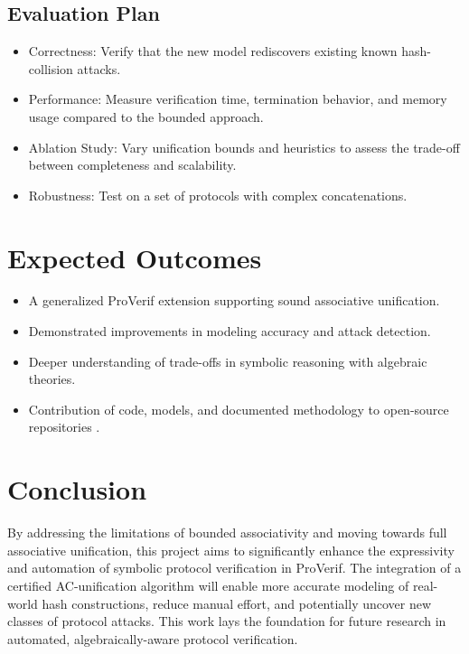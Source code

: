 \documentclass[journal]{IEEEtran}
\begin{document}
\subsection{Evaluation Plan}
\begin{itemize}
    \item Correctness: Verify that the new model rediscovers existing known hash-collision attacks.
    \item Performance: Measure verification time, termination behavior, and memory usage compared to the bounded approach.
    \item Ablation Study: Vary unification bounds and heuristics to assess the trade-off between completeness and scalability.
    \item Robustness: Test on a set of protocols with complex concatenations.
\end{itemize}

\section{Expected Outcomes}
\begin{itemize}
    \item A generalized ProVerif extension supporting sound associative unification.
    \item Demonstrated improvements in modeling accuracy and attack detection.
    \item Deeper understanding of trade-offs in symbolic reasoning with algebraic theories.
    \item Contribution of code, models, and documented methodology to open-source repositories \cite{our_repo, our_docker}.
\end{itemize}

\section{Conclusion}
By addressing the limitations of bounded associativity \cite{cheval2023hash} and moving towards full associative unification, this project aims to significantly enhance the expressivity and automation of symbolic protocol verification in ProVerif. The integration of a certified AC-unification algorithm \cite{ayala2024certified} will enable more accurate modeling of real-world hash constructions, reduce manual effort, and potentially uncover new classes of protocol attacks. This work lays the foundation for future research in automated, algebraically-aware protocol verification.
\end{document}

